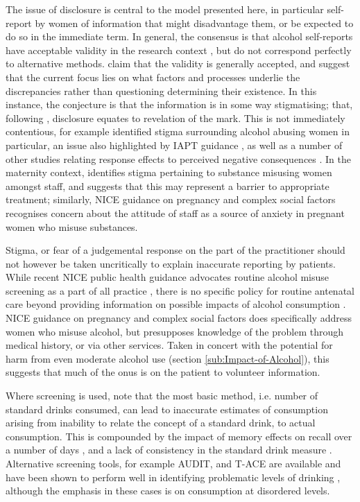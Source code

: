 The issue of disclosure is central to the model presented here, in
particular self-report by women of information that might disadvantage
them, or be expected to do so in the immediate term. In general, the
consensus is that alcohol self-reports have acceptable validity in
the research context \citep{DelBoca2000}, but do not correspond perfectly
to alternative methods. \citet{DelBoca2003} claim that the validity
is generally accepted, and suggest that the current focus lies on
what factors and processes underlie the discrepancies rather than
questioning determining their existence. In this instance, the conjecture
is that the information is in some way stigmatising; that, following
\citet{Goffman1999}, disclosure equates to revelation of the mark.
This is not immediately contentious, for example \citet{Gomberg1988}
identified stigma surrounding alcohol abusing women in particular,
an issue also highlighted by \ac{IAPT} guidance \citep{IAPT2012},
as well as a number of other studies relating response effects to
perceived negative consequences \citep{Langenbucher2001,DelBoca2000,Blair1977}.
In the maternity context, \citet{Radcliffe2011} identifies stigma
pertaining to substance misusing women amongst staff, and suggests
that this may represent a barrier to appropriate treatment; similarly,
\ac{NICE} guidance on pregnancy and complex social factors \citep{NICE2010}
recognises concern about the attitude of staff as a source of anxiety
in pregnant women who misuse substances.

Stigma, or fear of a judgemental response on the part of the practitioner
should not however be taken uncritically to explain inaccurate reporting
by patients. While recent \ac{NICE} public health guidance advocates
routine alcohol misuse screening as a part of all practice \citep{NationalInstituteforHealthandCareExcellence2010},
there is no specific policy for routine antenatal care beyond providing
information on possible impacts of alcohol consumption \citep{NICE2010a}.
\ac{NICE} guidance on pregnancy and complex social factors \citep{NICE2010}
does specifically address women who misuse alcohol, but presupposes
knowledge of the problem through medical history, or via other services.
Taken in concert with the potential for harm from even moderate alcohol
use (section \ref{sub:Impact-of-Alcohol}), this suggests that much
of the onus is on the patient to volunteer information.

Where screening is used, \citet{Kaskutas2000} note that the most
basic method, i.e. number of standard drinks consumed, can lead to
inaccurate estimates of consumption arising from inability to relate
the concept of a standard drink, to actual consumption. This is compounded
by the impact of memory effects on recall over a number of days \citep{Stockwell2004},
and a lack of consistency in the standard drink measure \citep{Turner1990}.
Alternative screening tools, for example \acs{AUDIT}, and \acs{T-ACE}
are available and have been shown to perform well in identifying problematic
levels of drinking \citep{Piccinelli1997,Bradley1998,Russell1994,Russell1996},
although the emphasis in these cases is on consumption at disordered
levels. 

